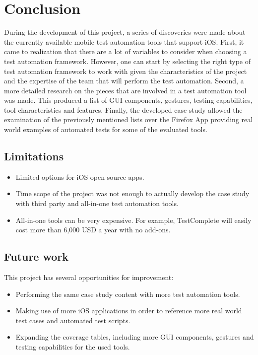 \chapter{Conclusion}
\label{chapter5}

During the development of this project, a series of discoveries were made about the currently available mobile test automation tools that support iOS. First, it came to realization that there are a lot of variables to consider when choosing a test automation framework. However, one can start by selecting the right type of test automation framework to work with given the characteristics of the project and the expertise of the team that will perform the test automation. Second, a more detailed research on the pieces that are involved in a test automation tool was made. This produced a list of GUI components, gestures, testing capabilities, tool characteristics and features. Finally, the developed case study allowed the examination of the previously mentioned lists over the Firefox App providing real world examples of automated tests for some of the evaluated tools.

\section{Limitations}
	\begin{itemize}
		\item Limited options for iOS open source apps.
		\item Time scope of the project was not enough to actually develop the case study with third party and all-in-one test automation tools.
		\item All-in-one tools can be very expensive. For example, TestComplete will easily cost more than 6,000 USD a year with no add-ons.
	\end{itemize}


\section{Future work}

This project has several opportunities for improvement:

	\begin{itemize}
		\item Performing the same case study content with more test automation tools. 
		\item Making use of more iOS applications in order to reference more real world test cases and automated test scripts.
		\item Expanding the coverage tables, including more GUI components, gestures and testing capabilities for the used tools.
	\end{itemize}

